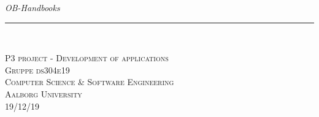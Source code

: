 


\thispagestyle{empty}
\begin{flushright}

\vspace{3cm}

\phantom{hul}

\phantom{hul}

\phantom{hul}

\textsl{\Huge  OB-Handbooks} \\ \vspace{1cm}

\rule{13cm}{3mm} \\ \vspace{1.5cm}
\vspace{1cm}

\vspace{2cm} 
\textsc{\Large P3 project - Development of applications\\
Gruppe ds304e19 \\
Computer Science \& Software Engineering\\
Aalborg University\\
19/12/19\\}
\end{flushright}
